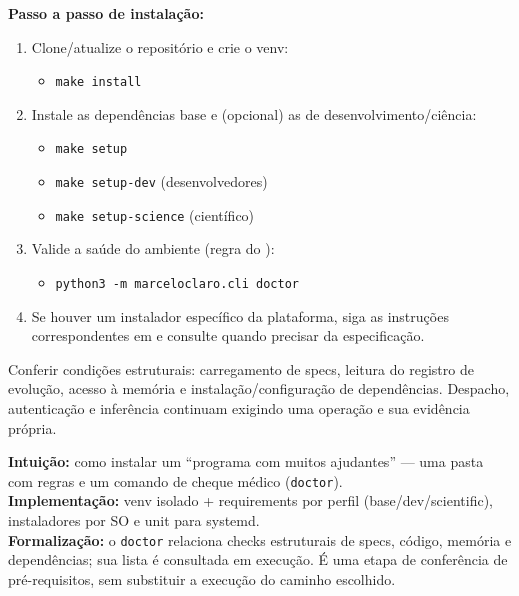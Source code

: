 \begin{metodo}
\textbf{Passo a passo de instalação:}
\begin{enumerate}[leftmargin=1.4em,itemsep=1pt]
  \item Clone/atualize o repositório e crie o venv:
  \begin{itemize}[leftmargin=1.3em,itemsep=0pt]
    \item \texttt{make\ install}
  \end{itemize}
  \item Instale as dependências base e (opcional) as de desenvolvimento/ciência:
  \begin{itemize}[leftmargin=1.3em,itemsep=0pt]
    \item \texttt{make\ setup}
    \item \texttt{make\ setup-dev} (desenvolvedores)
    \item \texttt{make\ setup-science} (científico)
  \end{itemize}
  \item Valide a saúde do ambiente (regra do ):
  \begin{itemize}[leftmargin=1.3em,itemsep=0pt]
    \item \texttt{python3\ -m\ marceloclaro.cli\ doctor}
  \end{itemize}
  \item Se houver um instalador específico da plataforma, siga as instruções
        correspondentes em  e consulte  quando precisar
        da especificação.
\end{enumerate}
\end{metodo}

\begin{funcao}
Conferir condições estruturais: carregamento de specs, leitura do registro de
evolução, acesso à memória e instalação/configuração de dependências. Despacho,
autenticação e inferência continuam exigindo uma operação e sua evidência própria.
\end{funcao}

\begin{niveis}
\textbf{Intuição:} como instalar um ``programa com muitos ajudantes'' — uma pasta com
regras e um comando de cheque médico (\texttt{doctor}).\\
\textbf{Implementação:} venv isolado + requirements por perfil (base/dev/scientific),
instaladores por SO e unit para systemd.\\
\textbf{Formalização:} o \texttt{doctor} relaciona checks estruturais de
specs, código, memória e dependências; sua lista é consultada em execução.
É uma etapa de conferência de pré-requisitos, sem substituir a execução do caminho escolhido.
\end{niveis}

